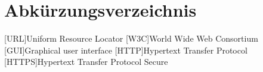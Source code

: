 \newpage
\chapter*{Abkürzungsverzeichnis}
\begin{acronym}
    [URL]{Uniform Resource Locator}
    [W3C]{World Wide Web Consortium}
    [GUI]{Graphical user interface}
    [HTTP]{Hypertext Transfer Protocol}
    [HTTPS]{Hypertext Transfer Protocol Secure}
\end{acronym}